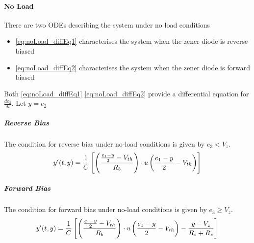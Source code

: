 \paragraph{No Load}
There are two ODEs describing the system under no load conditions
\begin{itemize}
	\item \eqref{eq:noLoad_diffEq1} characterises the system when the zener diode is reverse biased
	\item \eqref{eq:noLoad_diffEq2} characterises the system when the zener diode is forward biased
\end{itemize}
Both \eqref{eq:noLoad_diffEq1} \eqref{eq:noLoad_diffEq2} provide a differential equation for $\frac{de_2}{dt}$. Let $y = e_2$

\subparagraph{Reverse Bias}
The condition for reverse bias under no-load conditions is given by $e_3 < V_z$.
\begin{equation}
	y'(t,y) = \frac{1}{C} \left[\left(\frac{\frac{e_1 - y}{2} - V_{th}}{R_b} \right) \cdot u\left(\frac{e_1-y}{2}-V_{th} \right) \right]
\end{equation}
\subparagraph{Forward Bias}
The condition for forward bias under no-load conditions is given by $e_3 \geq V_z$.  
\begin{equation}
	y'(t,y) = \frac{1}{C}\left[\left(\frac{\frac{e_1 - y}{2} - V_{th}}{R_b} \right)\cdot u\left(\frac{e_1 - y}{2} - V_{th} \right)-\frac{y-V_z}{R_s+R_z} \right]
\end{equation}